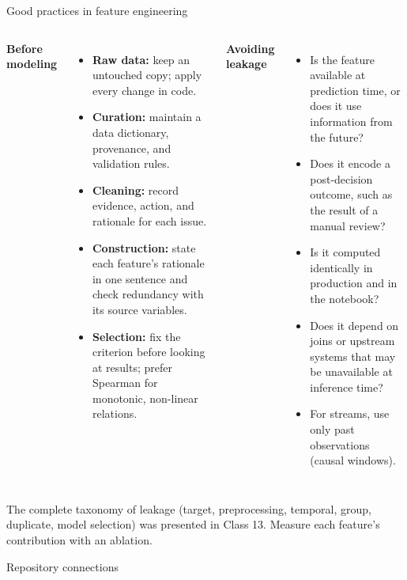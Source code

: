 \begin{frame}{Good practices in feature engineering}
\begin{columns}[T]
\textbf{Before modeling}
\begin{itemize}\footnotesize
\item \textbf{Raw data:} keep an untouched copy; apply every change in code.
\item \textbf{Curation:} maintain a data dictionary, provenance, and validation rules.
\item \textbf{Cleaning:} record evidence, action, and rationale for each issue.
\item \textbf{Construction:} state each feature's rationale in one sentence and check redundancy with its source variables.
\item \textbf{Selection:} fix the criterion before looking at results; prefer Spearman for monotonic, non-linear relations.
\end{itemize}
\textbf{Avoiding leakage}
\begin{itemize}\footnotesize
\item Is the feature available at prediction time, or does it use information from the future?
\item Does it encode a post-decision outcome, such as the result of a manual review?
\item Is it computed identically in production and in the notebook?
\item Does it depend on joins or upstream systems that may be unavailable at inference time?
\item For streams, use only past observations (causal windows).
\end{itemize}
\end{columns}
\vspace{0.3em}
{\footnotesize The complete taxonomy of leakage (target, preprocessing, temporal, group, duplicate, model selection) was presented in Class 13. Measure each feature's contribution with an ablation.}
\coursefooter
\end{frame}
\begin{frame}{Repository connections}
\coursefooter
\end{frame}
